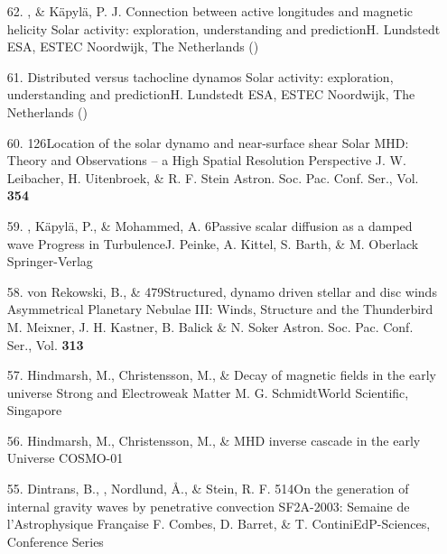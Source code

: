 \begin{itemize}
\item[62.]
\Brandenburg, \& K\"apyl\"a, P. J.
{Connection between active longitudes and magnetic helicity}
{Solar activity: exploration, understanding and prediction}{H. Lundstedt}
{ESA, ESTEC Noordwijk, The Netherlands}
()

\item[61.]
\Brandenburg{}
{Distributed versus tachocline dynamos}
{Solar activity: exploration, understanding and prediction}{H. Lundstedt}
{ESA, ESTEC Noordwijk, The Netherlands}
()

\item[60.]
\Brandenburg{}
{126}{Location of the solar dynamo and near-surface shear}
{Solar MHD: Theory and Observations -- a High Spatial Resolution Perspective}
{J. W. Leibacher, H. Uitenbroek, \& R. F. Stein}
{Astron. Soc. Pac. Conf. Ser., Vol. {\bf 354}}

\item[59.]
\Brandenburg, K\"apyl\"a, P., \& Mohammed, A.
{6}{Passive scalar diffusion as a damped wave}
{Progress in Turbulence}{J. Peinke, A. Kittel, S. Barth, \& M. Oberlack}
{Springer-Verlag}

\item[58.]
von Rekowski, B., \& \Brandenburg{}
{479}{Structured, dynamo driven stellar and disc winds}
{Asymmetrical Planetary Nebulae III: Winds, Structure and the Thunderbird}
{M. Meixner, J. H. Kastner, B. Balick \& N. Soker}
{Astron. Soc. Pac. Conf. Ser., Vol. {\bf 313}}

\item[57.]
Hindmarsh, M., Christensson, M., \& \Brandenburg{}
{Decay of magnetic fields in the early universe}
{Strong and Electroweak Matter}
{M. G. Schmidt}{World Scientific, Singapore}

\item[56.]
Hindmarsh, M., Christensson, M., \& \Brandenburg{}
{MHD inverse cascade in the early Universe}
{COSMO-01}
{}
{}

\item[55.]
Dintrans, B., \Brandenburg, Nordlund, \AA., \& Stein, R. F.
{514}{On the generation of internal gravity waves by penetrative convection}
{SF2A-2003: Semaine de l'Astrophysique Fran{\c c}aise}
{F. Combes, D. Barret, \& T. Contini}{EdP-Sciences, Conference Series}


\end{itemize}
